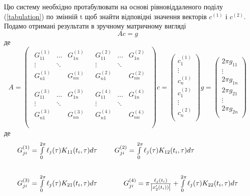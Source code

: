 \documentclass[14pt,a4paper]{extarticle}
\newcounter{e}
\numberwithin{equation}{section}
\numberwithin{figure}{section}
\newcommand{\intl}{\int\limits}
\newcommand{\inttwopi}{\intl_{0}^{2\pi}}
\begin{document}
 Цю систему необхідно протабулювати на основі рівновіддаленого поділу (\ref{tabulation}) по змінній t щоб знайти відповідні значення векторів $c^{(1)}$ і $c^{(2)}$.
 Подамо отримані результати в зручному матричному вигляді
 $$
 Ac=g
 $$
 де
 $$
 A =
 \begin{pmatrix}
	 \begin{matrix}
	 	G^{(1)}_{11} & \dots  & G^{(1)}_{1n} \\
	 	\vdots 		 & \ddots & \\
	 	G^{(1)}_{n1} & 		  & G^{(1)}_{nn} \\
	 \end{matrix} &
	 \begin{matrix}
	 	G^{(2)}_{11} & \dots  & G^{(2)}_{1n} \\
	 	\vdots 		 & \ddots & \\
	 	G^{(2)}_{n1} & 		  & G^{(2)}_{nn} \\
	 \end{matrix} \\[1cm]
	 \begin{matrix}
		G^{(3)}_{11} & \dots  & G^{(3)}_{1n} \\
		\vdots 		 & \ddots & \\
		G^{(3)}_{n1} & 		  & G^{(3)}_{nn} \\
	 \end{matrix} &
	 \begin{matrix}
		G^{(4)}_{11} & \dots  & G^{(4)}_{1n} \\
		\vdots 		 & \ddots & \\
		G^{(4)}_{n1} & 		  & G^{(4)}_{nn} \\
	 \end{matrix} \\
 \end{pmatrix}
 c = 
 \begin{pmatrix}
	c^{(1)}_1\\
	\vdots\\
	c^{(1)}_n\\[0.5cm]
	c^{(2)}_1\\
	\vdots\\
	c^{(2)}_n\\
 \end{pmatrix}
 g = 
 \begin{pmatrix}
	2\pi g_{11}\\
	\vdots\\
	2\pi g_{1n}\\[0.5cm]
	2\pi g_{21}\\
	\vdots\\
	2\pi g_{2n}\\
 \end{pmatrix}
 $$
 де
 $$
 \begin{matrix}
	G^{(1)}_{ji} = \inttwopi \ell_{j}(\tau) K_{11}(t_i, \tau) d \tau & \hspace{-1.7cm}
	G^{(2)}_{ji} = \inttwopi \ell_{j}(\tau) K_{12}(t_i, \tau) d \tau \\[1cm]
	G^{(3)}_{ji} = \inttwopi \ell_{j}(\tau) K_{21}(t_i, \tau) d \tau & \hspace{1cm}
	G^{(4)}_{ji} = \pi\frac{\ell_{j}(t_i)}{\abs{x'_{2}(t_i))}}
				 + \inttwopi \ell_{j}(\tau) K_{22}(t_i, \tau) d \tau \\
 \end{matrix}
 $$
 
\end{document}
